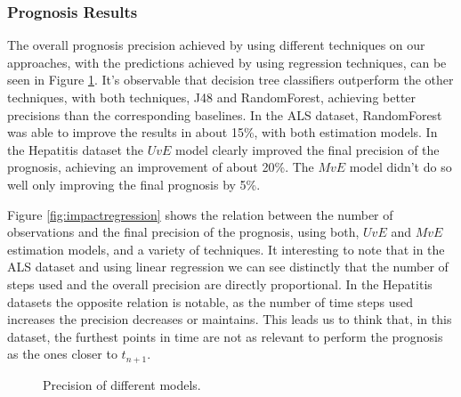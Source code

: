 \subsubsection{Prognosis Results}
\label{subsubsection:prognosis_regression}

The overall prognosis precision achieved by using different techniques on our approaches, with the predictions achieved by using regression 
techniques, can be seen in Figure \ref{fig:precisionregression}. It's observable that decision tree classifiers outperform the other techniques, with
both techniques, J48 and RandomForest, achieving better precisions than the corresponding baselines. In the ALS dataset, RandomForest was able to 
improve the results in about 15\%, with both estimation models. In the Hepatitis dataset the $UvE$ model clearly improved the final
 precision of the prognosis, achieving an improvement of about 20\%. The $MvE$ model didn't do so well only improving the final prognosis by 5\%. 

Figure \ref{fig:impactregression} shows the relation between the number of observations and the final precision of the prognosis, using both, $UvE$ and $MvE$
 estimation models, and a variety of techniques. It interesting to note that in the ALS dataset and using linear regression we can see distinctly that
 the number of steps used and the overall precision are directly proportional. In the Hepatitis datasets the opposite relation is notable, as the number 
 of time steps used increases the precision decreases or maintains. This leads us to think that, in this dataset, the furthest points in time are not as 
 relevant to perform the prognosis as the ones closer to $t_{n+1}$.

 \begin{figure}[h]
  \begin{subfigmatrix}{2}
  \end{subfigmatrix}
  \caption{Precision of different models.}
  \label{fig:precisionregression}
\end{figure}


